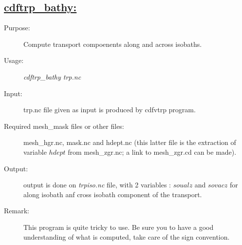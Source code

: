 \documentclass[a4paper,11pt]{article}
\begin{document}
\subsection*{\underline{cdftrp\_bathy:}}
\begin{description}
\item[Purpose:] Compute transport compoenents along and across isobaths.
\item[Usage:] {\em cdftrp\_bathy trp.nc }
\item[Input:] trp.nc file given as input is produced by cdfvtrp program.
\item[Required mesh\_mask files or other files:] mesh\_hgr.nc, mask.nc and hdept.nc (this latter file is the extraction of variable $hdept$ from
       mesh\_zgr.nc; a link to mesh\_zgr.cd can be made).
\item[Output:] output is done on {\em trpiso.nc} file, with 2 variables : $soualz$ and $sovacz$ for along isobath anf cross isobath component of 
 the transport.
\item[Remark:] This program is quite tricky to use. Be sure you to have a good understanding of what is computed, take care of the sign convention.
\end{description}

\newpage
\end{document}
